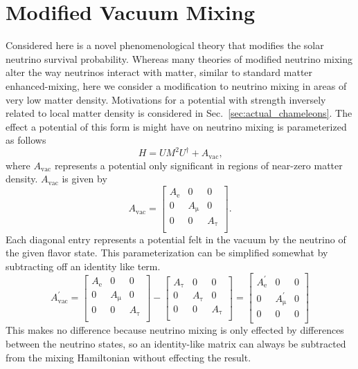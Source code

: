 \section{Modified Vacuum Mixing}
Considered here is a novel phenomenological theory that modifies the solar
neutrino survival probability.
Whereas many theories of modified neutrino mixing alter the way neutrinos
interact with matter, similar to standard matter enhanced-mixing,
here we consider a modification to neutrino mixing in areas of very low matter
density.
 Motivations for a potential with strength inversely related to local matter
density is considered in Sec.~\ref{sec:actual_chameleons}.
The effect a potential of this form is might have on neutrino
mixing is parameterized as follows
\begin{equation}
H = UM^{2}U^{\dagger} + A_{\mathrm{vac}}\text{,}
\end{equation}
where $A_{\mathrm{vac}}$ represents a potential only significant in regions
of near-zero matter density.
$A_{\mathrm{vac}}$ is given by
\begin{equation}
A_{\mathrm{vac}} =
\begin{bmatrix}
    A_{\mathrm{e}} & 0 & 0  \\
    0 &  A_{\mathrm{\mu}} & 0  \\
    0 & 0 &  A_{\mathrm{\tau}}  \\
\end{bmatrix}\text{.}
\end{equation}
Each diagonal entry represents a potential felt in the vacuum
by the neutrino of the given flavor state.
This parameterization can be simplified somewhat by subtracting off
an identity like term.
\begin{equation}
A_{\mathrm{vac}}^{\prime} =
\begin{bmatrix}
    A_{\mathrm{e}} & 0 & 0  \\
    0 &  A_{\mathrm{\mu}} & 0  \\
    0 & 0 &  A_{\mathrm{\tau}}  \\
\end{bmatrix} - 
\begin{bmatrix}
    A_{\mathrm{\tau}} & 0 & 0  \\
    0 &  A_{\mathrm{\tau}} & 0  \\
    0 & 0 &  A_{\mathrm{\tau}}  \\ 
\end{bmatrix} 
= 
\begin{bmatrix}
    A_{\mathrm{e}}^{\prime} & 0 & 0  \\
    0 &  A_{\mathrm{\mu}}^{\prime} & 0  \\
    0 & 0 &  0  \\ 
\end{bmatrix}  
\end{equation}
This makes no difference because neutrino mixing is only effected by differences
between the neutrino states, so an identity-like matrix can always be subtracted
from the mixing Hamiltonian without effecting the result.

